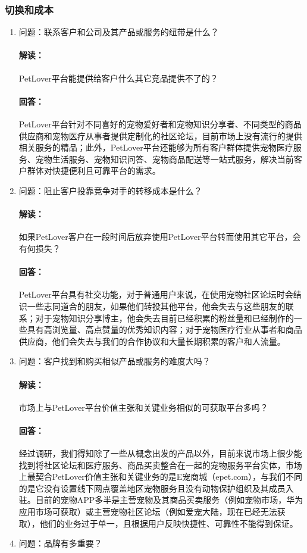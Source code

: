 \documentclass[a4paper]{ctexart}
\begin{document}
\subsubsection{切换和成本}
\begin{enumerate}[label=\alph*.]
  \item 问题：联系客户和公司及其产品或服务的纽带是什么？
  \paragraph{解读：}PetLover平台能提供给客户什么其它竞品提供不了的？
  \paragraph{回答：}PetLover平台针对不同喜好的宠物爱好者和宠物知识分享者、不同类型的商品供应商和宠物医疗从事者提供定制化的社区论坛，目前市场上没有流行的提供相关服务的精品；此外，PetLover平台还能够为所有客户群体提供宠物医疗服务、宠物生活服务、宠物知识问答、宠物商品配送等一站式服务，解决当前客户群体对快捷便利且可靠平台的需求。
  \item 问题：阻止客户投靠竞争对手的转移成本是什么？
  \paragraph{解读：}如果PetLover客户在一段时间后放弃使用PetLover平台转而使用其它平台，会有何损失？
  \paragraph{回答：}PetLover平台具有社交功能，对于普通用户来说，在使用宠物社区论坛时会结识一些志同道合的朋友，如果他们转投其他平台，他会失去与这些朋友的联系；对于宠物知识分享博主，他会失去目前已经积累的粉丝量和已经制作的一些具有高浏览量、高点赞量的优秀知识内容；对于宠物医疗行业从事者和商品供应商，他们会失去与我们的合作协议和大量长期积累的客户和人流量。
  \item 问题：客户找到和购买相似产品或服务的难度大吗？
  \paragraph{解读：}市场上与PetLover平台价值主张和关键业务相似的可获取平台多吗？
  \paragraph{回答：}经过调研，我们得知除了一些从概念出发的产品以外，目前来说市场上很少能找到将社区论坛和医疗服务、商品买卖整合在一起的宠物服务平台实体，市场上最契合PetLover价值主张和关键业务的是E宠商城（epet.com），与我们不同的是它没有设置线下网点覆盖地区宠物服务且没有动物保护组织及其成员入驻。目前的宠物APP多半是主营宠物及其商品买卖服务（例如宠物市场，华为应用市场可获取）或主营宠物社区论坛（例如爱宠大陆，现在已经无法获取），他们的业务过于单一，且根据用户反映快捷性、可靠性不能得到保证。
  \item 问题：品牌有多重要？

\end{enumerate}
\end{document}
